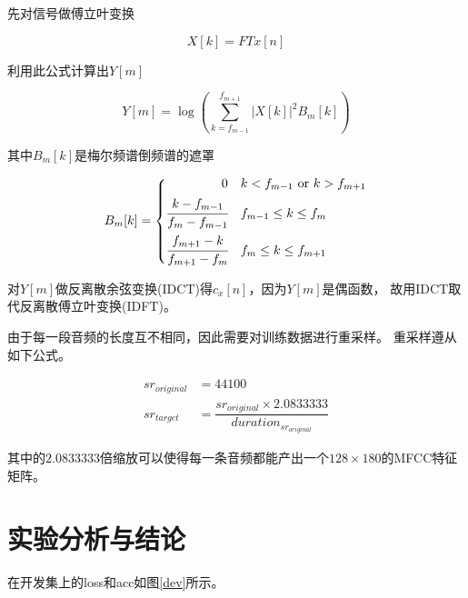 \documentclass{article}
\begin{document}
先对信号做傅立叶变换

\begin{equation}
    X[k]=FTx[n]
\end{equation}

利用此公式计算出$Y[m]$

\begin{equation}
    Y[m] = \log \left( \sum^{f_{m+1}}_{k=f_{m-1}} |X[k]|^2 B_m[k] \right)
\end{equation}

其中$B_m [k]$是梅尔频谱倒频谱的遮罩

\begin{equation}
    B_{m}[k]=\left\{
    \begin{aligned}
        0                                   & \quad k<f_{m-1} {\mbox{ or }} k>f_{m+1} \\
        {\cfrac {k-f_{m-1}}{f_{m}-f_{m-1}}} & \quad f_{m-1}\leq k\leq f_{m}           \\
        {\cfrac {f_{m+1}-k}{f_{m+1}-f_{m}}} & \quad f_{m}\leq k\leq f_{m+1}
    \end{aligned}
    \right.
\end{equation}

对$Y[m]$做反离散余弦变换(IDCT)得$c_x[n]$，因为$Y[m]$是偶函数，
故用IDCT取代反离散傅立叶变换(IDFT)\cite{cai2004hmm}。

由于每一段音频的长度互不相同，因此需要对训练数据进行重采样。
重采样遵从如下公式。

\begin{align*}
    sr_{original} & = 44100                                                            \\
    sr_{target}   & = \dfrac{sr_{original} \times 2.0833333}{duration_{sr_{original}}}
\end{align*}

其中的$2.0833333$倍缩放可以使得每一条音频都能产出一个$128 \times 180$的MFCC特征矩阵。


\section{实验分析与结论}

在开发集上的loss和acc如图\ref{dev}所示。
\end{document}
